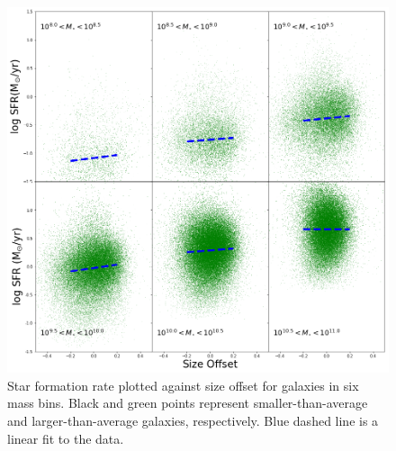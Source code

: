 \documentclass[iop]{emulateapj}
\begin{document}
	

	


\begin{figure}
	\centering
	\includegraphics[width=1.5 \columnwidth]{ha_lum_2x2_2A.png}
	\caption{Star formation rate plotted against size offset for galaxies in six mass bins. Black and green points represent smaller-than-average and larger-than-average galaxies, respectively. Blue dashed line is a linear fit to the data.}
     \label{fig:sfr}

\end{figure}
\end{document}
